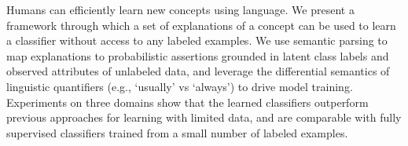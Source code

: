 Humans can efficiently learn new concepts using language. We present a framework through which a set of explanations of a concept can be used to learn a classifier without access to any labeled examples. We use semantic parsing to map explanations to probabilistic assertions grounded in latent class labels and observed attributes of unlabeled data, and leverage the differential semantics of linguistic quantifiers (e.g., `usually' vs `always') to drive model training. Experiments on three domains show that the learned classifiers outperform previous approaches for learning with limited data, and are comparable with fully supervised classifiers trained from a small number of labeled examples.
